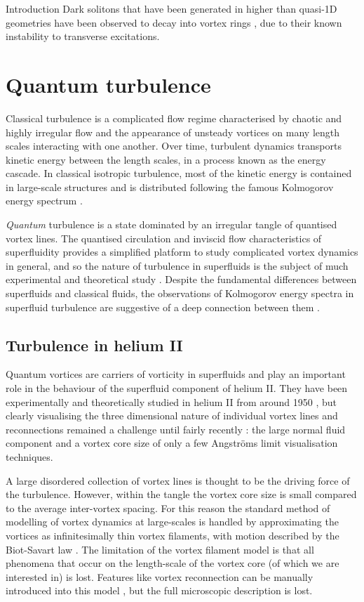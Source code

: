 \begin{chapter}{\label{cha:bose_gases}Introduction}
Dark solitons that have been generated in higher than quasi-1D geometries have been observed to decay into vortex rings \cite{PhysRevLett.86.2926,Dutton27072001,Shomroni09}, due to their known instability to transverse excitations.


\section{Quantum turbulence}
Classical turbulence is a complicated flow regime characterised by chaotic and highly irregular flow and the appearance of unsteady vortices on many length scales interacting with one another. Over time, turbulent dynamics transports kinetic energy between the length scales, in a process known as the energy cascade. In classical isotropic turbulence, most of the kinetic energy is contained in large-scale structures and is distributed following the famous Kolmogorov energy spectrum \cite{davidson2004turbulence}.

{\it Quantum} turbulence is a state dominated by an irregular tangle of quantised vortex lines. The quantised circulation and inviscid flow characteristics of superfluidity provides a simplified platform to study complicated vortex dynamics in general, and so the nature of turbulence in superfluids is the subject of much experimental and theoretical study \cite{Bradley11,skebek12,PhysRevLett.110.014502,barenghi_skrbek_14,PhysRevLett.115.155303}. Despite the fundamental differences between superfluids and classical fluids, the observations of Kolmogorov energy spectra in superfluid turbulence are suggestive of a deep connection between them \cite{barenghi_skrbek_14}. 

\subsection{Turbulence in helium II}
Quantum vortices are carriers of vorticity in superfluids and play an important role in the behaviour of the superfluid component of helium II. They have been experimentally and theoretically studied in helium II from around 1950 \cite{Donnelly}, but clearly visualising the three dimensional nature of individual vortex lines and reconnections remained a challenge until fairly recently \cite{Bewley09,Fonda12}: the large normal fluid component and a vortex core size of only a few Angstr\"oms limit visualisation techniques.

A large disordered collection of vortex lines is thought to be the driving force of the turbulence. However, within the tangle the vortex core size is small compared to the average inter-vortex spacing. For this reason the standard method of modelling of vortex dynamics at large-scales is handled by approximating the vortices as infinitesimally thin vortex filaments, with motion described by the Biot-Savart law \cite{barenghi_donnelly_01}. The limitation of the vortex filament model is that all phenomena that occur on the length-scale of the vortex core (of which we are interested in) is lost. Features like vortex reconnection can be manually introduced into this model \cite{barenghi_donnelly_01}, but the full microscopic description is lost.


\end{chapter}
